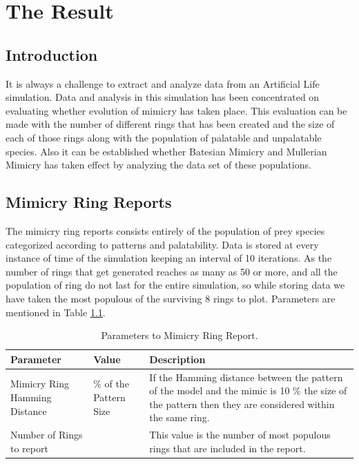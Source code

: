 \chapter{The Result}

\section{Introduction}
It is always a challenge to extract and analyze data from an Artificial Life simulation. Data and analysis in this simulation has been concentrated on evaluating whether evolution of mimicry has taken place. This evaluation can be made with the number of different rings that has been created and the size of each of those rings along with the population of palatable and unpalatable species. Also it can be established whether Batesian Mimicry and Mullerian Mimicry has taken effect by analyzing the data set of these populations.

\section{Mimicry Ring Reports}
The mimicry ring reports consists entirely of the population of prey species categorized according to patterns and palatability. Data is stored at every instance of time of the simulation keeping an interval of 10 iterations. As the number of rings that get generated reaches as many as 50 or more, and all the population of ring do not last for the entire simulation, so while storing data we have taken the most populous of the surviving 8 rings to plot. Parameters are mentioned in Table \ref{tab:ring-report-control-parameters}.

\begin{table}[H]
\centering
\begin{tabular}{| p{2cm} | >{\centering} p{2.2cm} | p{8cm} |}
	\hline
		\textbf{Parameter} & \textbf{Value} & \textbf{Description} \\ \hline
		Mimicry Ring Hamming Distance & 10 \% of the Pattern Size & If the Hamming distance between the pattern of the model and the mimic is 10 \% the size of the pattern then they are considered within the same ring.\\ \hline
		Number of Rings to report & 8 & This value is the number of most populous rings that are included in the report.\\
	\hline
\end{tabular}
\caption{Parameters to Mimicry Ring Report.}
\label{tab:ring-report-control-parameters}
\end{table}


